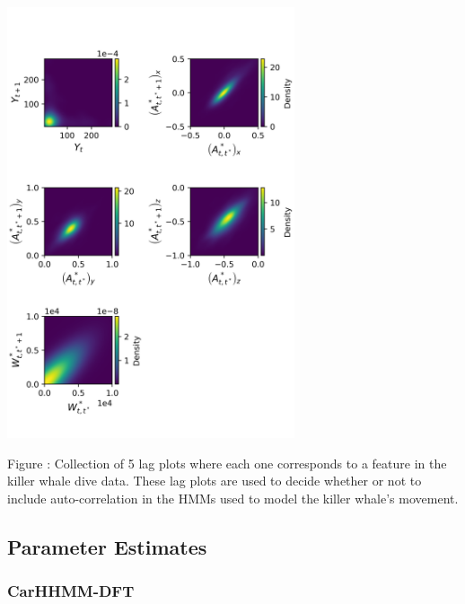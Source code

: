 \documentclass{article}
\begin{document}
        \begin{center}
        \includegraphics[height=5in]{../Plots/CarHHMM2_lagplot.png}
        \end{center}
        
        \noindent Figure : Collection of 5 lag plots where each one corresponds to a feature in the killer whale dive data. These lag plots are used to decide whether or not to include auto-correlation in the HMMs used to model the killer whale's movement.
        \addtocounter{fignum}{1}
        
        \newpage
    
    \subsection{Parameter Estimates}

        \subsubsection{CarHHMM-DFT}
        
\end{document}
